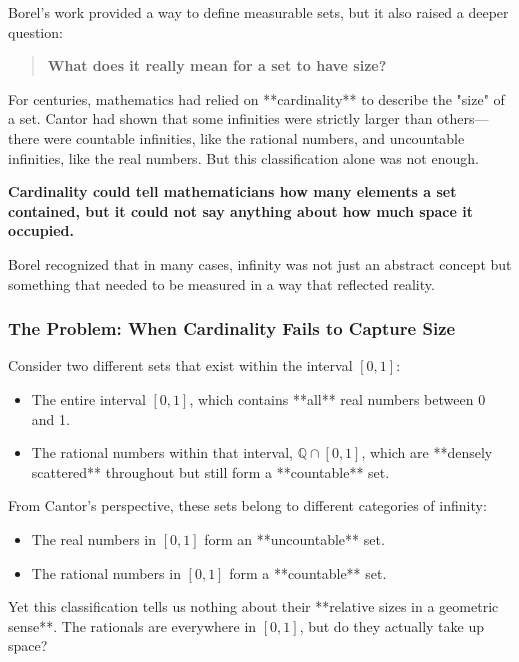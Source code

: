 Borel’s work provided a way to define measurable sets, but it also raised a deeper question: 

\begin{quote}
\textbf{What does it really mean for a set to have size?}
\end{quote}

For centuries, mathematics had relied on **cardinality** to describe the "size" of a set. Cantor had shown that some infinities were strictly larger than others—there were countable infinities, like the rational numbers, and uncountable infinities, like the real numbers. But this classification alone was not enough. 

\textbf{Cardinality could tell mathematicians how many elements a set contained, but it could not say anything about how much space it occupied.} 

Borel recognized that in many cases, infinity was not just an abstract concept but something that needed to be measured in a way that reflected reality.

\subsubsection{The Problem: When Cardinality Fails to Capture Size}

Consider two different sets that exist within the interval \( [0,1] \):

\begin{itemize}
    \item The entire interval \( [0,1] \), which contains **all** real numbers between 0 and 1.
    \item The rational numbers within that interval, \( \mathbb{Q} \cap [0,1] \), which are **densely scattered** throughout but still form a **countable** set.
\end{itemize}

From Cantor’s perspective, these sets belong to different categories of infinity:

\begin{itemize}
    \item The real numbers in \( [0,1] \) form an **uncountable** set.
    \item The rational numbers in \( [0,1] \) form a **countable** set.
\end{itemize}

Yet this classification tells us nothing about their **relative sizes in a geometric sense**. The rationals are everywhere in \( [0,1] \), but do they actually take up space? 

